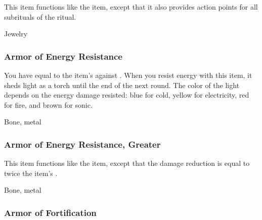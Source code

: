 This item functions like the  item, except that it also provides action points for all subrituals of the  ritual.



 


 Jewelry


\lowercase{\hypertarget{item:Armor of Energy Resistance}{}}\label{item:Armor of Energy Resistance}
\hypertarget{item:Armor of Energy Resistance}{\subsubsection{Armor of Energy Resistance\hfill{}}}

You have  equal to the item's  against .
When you resist energy with this item, it sheds light as a torch until the end of the next round.
The color of the light depends on the energy damage resisted: blue for cold, yellow for electricity, red for fire, and brown for sonic.



 


 Bone, metal


\lowercase{\hypertarget{item:Armor of Energy Resistance, Greater}{}}\label{item:Armor of Energy Resistance, Greater}
\hypertarget{item:Armor of Energy Resistance, Greater}{\subsubsection{Armor of Energy Resistance, Greater\hfill{}}}

This item functions like the  item, except that the damage reduction is equal to twice the item's .



 


 Bone, metal


\lowercase{\hypertarget{item:Armor of Fortification}{}}\label{item:Armor of Fortification}
\hypertarget{item:Armor of Fortification}{\subsubsection{Armor of Fortification\hfill{}}}

